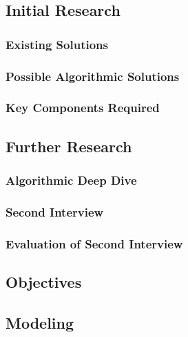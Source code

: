 \begin{flushleft}
        \bk

        \subsection{Initial Research} 
            \subsubsection{Existing Solutions}
            \lipsum[2]

            \subsubsection{Possible Algorithmic Solutions}
            \lipsum[2]

            \subsubsection{Key Components Required}
            \lipsum[2]

        \subsection{Further Research}
            \subsubsection{Algorithmic Deep Dive}
            \lipsum[2]

            \subsubsection{Second Interview}
            \lipsum[2]

            \subsubsection{Evaluation of Second Interview}
            \lipsum[2]

        \subsection{Objectives}
            \lipsum[2]

        \subsection{Modeling}
            \lipsum[2]

        \bk

\end{flushleft}